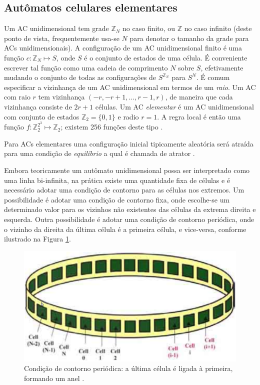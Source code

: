 \documentclass[12pt,a4paper]{article}
\begin{document}
\subsection{Autômatos celulares elementares}

Um AC unidimensional tem grade $\mathbb{Z}_N$ no caso finito, ou $\mathbb{Z}$
no caso infinito (deste ponto de vista, frequentemente usa-se $N$ para denotar
o tamanho da grade para ACs unidimensionais). A configuração de um AC
unidimensional finito é uma função $c: \mathbb{Z}_N \mapsto S$, onde $S$ é o
conjunto de estados de uma célula. É conveniente escrever tal função como
uma cadeia de comprimento $N$ sobre $S$, efetivamente mudando o conjunto de
todas as configurações de $S^{\mathbb{Z}_N}$ para $S^N$. É comum especificar
a vizinhança de um AC unidimensional em termos de um
\textit{raio}. Um AC com raio $r$ tem vizinhança $(-r,-r+1,\ldots,r-1,r)$,
de maneira que cada vizinhança consiste de $2r+1$ células. Um AC
\textit{elementar} é um AC unidimensional com conjunto de estados
$\mathbb{Z}_2 = \{0,1\}$ e radio $r=1$. A regra local é então uma função
$f: \mathbb{Z}^{2^3}_2 \mapsto \mathbb{Z}_2$; existem 256 funções deste
tipo .

Para ACs elementares uma configuração inicial tipicamente aleatória será atraída
para uma condição de \textit{equilíbrio} a qual é chamada de atrator .

Embora teoricamente um autômato unidimensional possa ser interpretado como uma linha bi-infinita,
na prática existe uma quantidade fixa de células e é necessário adotar uma condição de contorno
para as células nos extremos. Um possibilidade é adotar uma condição de contorno fixa, onde
escolhe-se um determinado valor para os vizinhos não existentes das células da extrema direita
e esquerda. Outra possibilidade é adotar uma condição de contorno periódica, onde o vizinho
da direita da última célula é a primeira célula, e vice-versa, conforme ilustrado na Figura
\ref{fig:ring}.

\begin{figure}[htp]
\begin{center}
\includegraphics[scale=0.3]{img/ring.eps}
\caption{Condição de contorno periódica: a última célula é ligada à primeira,
formando um anel .}
\label{fig:ring}
\end{center}
\end{figure}
\end{document}
